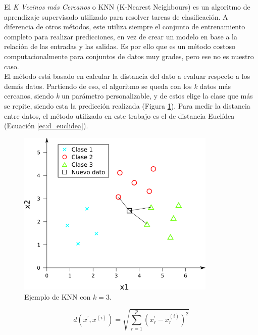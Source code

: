 El \textit{K Vecinos más Cercanos} o KNN (K-Nearest Neighbours) es un algoritmo de aprendizaje supervisado utilizado para resolver tareas de clasificación. A diferencia de otros métodos, este utiliza siempre el conjunto de entrenamiento completo para realizar predicciones, en vez de crear un modelo en base a la relación de las entradas y las salidas. Es por ello que es un método costoso computacionalmente para conjuntos de datos muy grades, pero ese no es nuestro caso.\\

El método está basado en calcular la distancia del dato a evaluar respecto a los demás datos. Partiendo de eso, el algoritmo se queda con los \textit{k} datos más cercanos, siendo \textit{k} un parámetro personalizable, y de estos elige la clase que más se repite, siendo esta la predicción realizada (Figura \ref{fig:knn}). Para medir la distancia entre datos, el método utilizado en este trabajo es el de distancia Euclídea (Ecuación \ref{ec:d_euclidea}).\\

\begin{figure} [h!]
  \begin{center}
    \includegraphics[width=95mm]{figs/knn.png}
  \end{center}
  \captionsetup{justification=centering}
  \caption{Ejemplo de KNN con $k = 3$.}
  \label{fig:knn}
\end{figure}

\begin{myequation}[h]
\begin{equation}
d(x^{\prime}, x^{(i)}) = \sqrt{\sum_{r=1}^{p}(x_{r}^{\prime}-x_{r}^{(i)})^{2}}
\nonumber
\label{ec:d_euclidea}
\end{equation}
\captionsetup{justification=centering}
\caption[Distancia Euclídea de un vector $x^{\prime}$ con \textit{p} características respecto al vector i-ésimo $(x^{(i)})$]{Distancia Euclídea de un vector $x^{\prime}$ \\
con \textit{p} características respecto al vector i-ésimo $(x^{(i)})$}
\end{myequation} 


